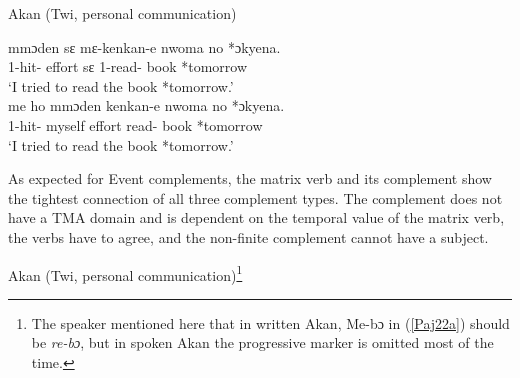 \documentclass[output=paper]{langscibook}
\begin{document}
\begin{exe}
\ex \label{Paj21} Akan (Twi, personal communication)
\begin{xlist}

\ex \label{Paj21a} 
 {mmɔden} {sɛ} {mɛ-kenkan-e} {nwoma} {no} *{ɔkyena.}\\
    1{\sg}-hit-{\compl} effort s{ɛ} 1{\sg}-read-{\compl} book  *tomorrow\\
\glt `I tried to read the book *tomorrow.'\\

\ex \label{Paj21b} 
 {me ho} {mmɔden} {kenkan-e} {nwoma} {no} *{ɔkyena.}\\
    1{\sg}-hit-{\compl} myself effort read-{\compl} book  *tomorrow\\
\glt `I tried to read the book *tomorrow.'\\

\end{xlist}
\end{exe}

As expected for Event complements, the matrix verb and its complement show the tightest connection of all three complement types. The complement does not have a TMA domain and is dependent on the temporal value of the matrix verb, the verbs have to agree, and the non-finite complement cannot have a subject.  

\begin{exe}
\ex \label{Paj22} Akan (Twi, personal communication)\footnote{The speaker mentioned here that in written Akan, {Me-bɔ} in (\ref{Paj22a}) should be \emph{re-bɔ}, but in spoken Akan the progressive marker is omitted most of the time.}
\begin{xlist}






\end{xlist}
\end{exe}
\end{document}
